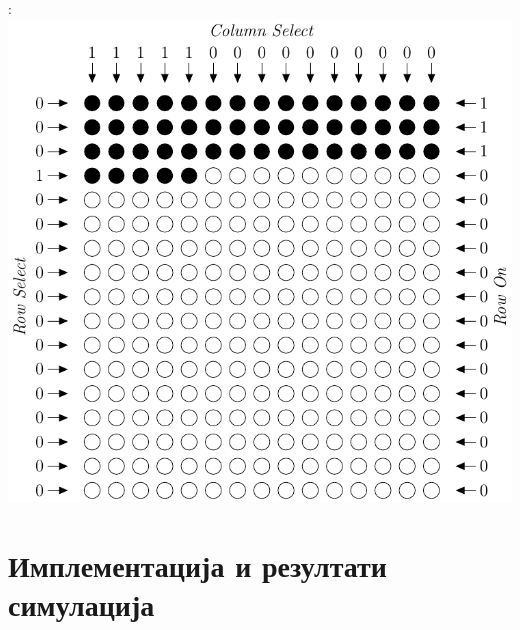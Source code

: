 \documentclass[aspectratio=169]{beamer}
\begin{document}
\begin{frame}{\secname: \subsecname}
	\centering
	\includegraphics[scale=0.6]{slike/prezentacija/ctrl_dec_example.pdf}
\end{frame}

\section{Имплементација и резултати симулација}
\end{document}
